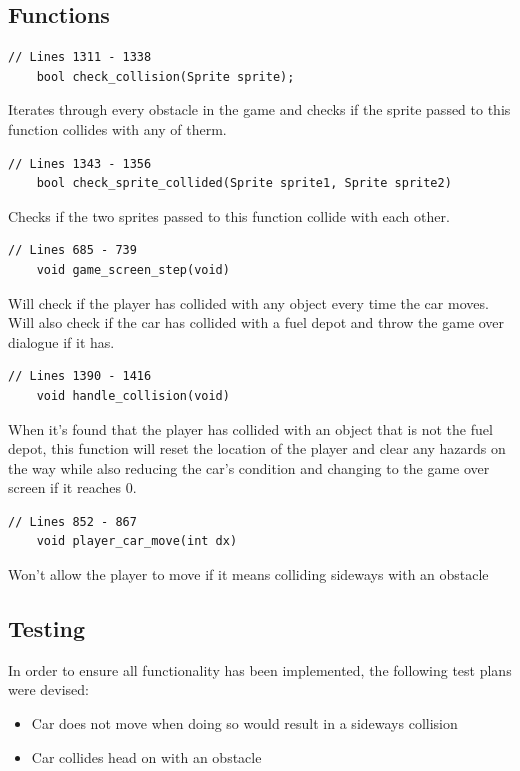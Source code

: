 \documentclass{article}
\begin{document}
\subsection*{Functions}
\begin{lstlisting}[style=CStyle]
	// Lines 1311 - 1338
	bool check_collision(Sprite sprite);
\end{lstlisting}
Iterates through every obstacle in the game and checks if the sprite passed to this function collides with any of therm.
\begin{lstlisting}[style=CStyle]
	// Lines 1343 - 1356
	bool check_sprite_collided(Sprite sprite1, Sprite sprite2)
\end{lstlisting}
Checks if the two sprites passed to this function collide with each other.
\begin{lstlisting}[style=CStyle]
	// Lines 685 - 739
	void game_screen_step(void)
\end{lstlisting}
Will check if the player has collided with any object every time the car moves. Will also check if the car has collided with a fuel depot and throw the game over dialogue if it has.
\begin{lstlisting}[style=CStyle]
	// Lines 1390 - 1416
	void handle_collision(void)
\end{lstlisting}
When it's found that the player has collided with an object that is not the fuel depot, this function will reset the location of the player and clear any hazards on the way while also reducing the car's condition and changing to the game over screen if it reaches 0.
\begin{lstlisting}[style=CStyle]
	// Lines 852 - 867
	void player_car_move(int dx) 
\end{lstlisting}
Won't allow the player to move if it means colliding sideways with an obstacle
\newpage

\subsection*{Testing}
In order to ensure all functionality has been implemented, the following test plans were devised:
\begin{itemize}
	\item Car does not move when doing so would result in a sideways collision
	\item Car collides head on with an obstacle
\end{itemize}
\end{document}
